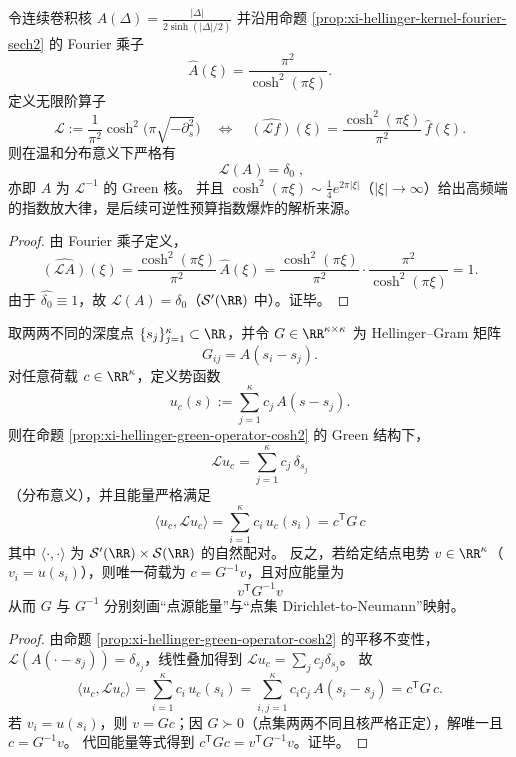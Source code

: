 %

\begin{proposition}\label{prop:xi-hellinger-green-operator-cosh2}
令连续卷积核
\(
A(\Delta)=\frac{|\Delta|}{2\sinh(|\Delta|/2)}
\)
并沿用命题 \ref{prop:xi-hellinger-kernel-fourier-sech2} 的 Fourier 乘子
\[
\widehat A(\xi)=\frac{\pi^2}{\cosh^2(\pi\xi)}.
\]
定义无限阶算子
\[
\mathcal L:=\frac{1}{\pi^2}\cosh^{2}\!\bigl(\pi\sqrt{-\partial_s^{2}}\bigr)
\quad\Longleftrightarrow\quad
\widehat{(\mathcal L f)}(\xi)=\frac{\cosh^{2}(\pi\xi)}{\pi^2}\,\widehat f(\xi).
\]
则在温和分布意义下严格有
\[
\boxed{\;\mathcal L(A)=\delta_0\;},
\]
亦即 \(A\) 为 \(\mathcal L^{-1}\) 的 Green 核。
并且 \(\cosh^{2}(\pi\xi)\sim \tfrac14 e^{2\pi|\xi|}\)（\(|\xi|\to\infty\)）给出高频端的指数放大律，是后续可逆性预算指数爆炸的解析来源。
\end{proposition}
\begin{proof}
由 Fourier 乘子定义，
\[
\widehat{(\mathcal L A)}(\xi)
=\frac{\cosh^{2}(\pi\xi)}{\pi^2}\,\widehat A(\xi)
=\frac{\cosh^{2}(\pi\xi)}{\pi^2}\cdot\frac{\pi^2}{\cosh^{2}(\pi\xi)}
=1.
\]
由于 \(\widehat{\delta_0}\equiv 1\)，故 \(\mathcal L(A)=\delta_0\)（\(\mathcal S'(\RR)\) 中）。证毕。
\end{proof}

\begin{proposition}\label{prop:xi-hellinger-charge-potential-duality-dtn}
取两两不同的深度点 \(\{s_j\}_{j=1}^\kappa\subset\RR\)，并令 \(G\in\RR^{\kappa\times\kappa}\) 为 Hellinger--Gram 矩阵
\[
G_{ij}=A(s_i-s_j).
\]
对任意荷载 \(c\in\RR^\kappa\)，定义势函数
\[
u_c(s):=\sum_{j=1}^{\kappa}c_j\,A(s-s_j).
\]
则在命题 \ref{prop:xi-hellinger-green-operator-cosh2} 的 Green 结构下，
\[
\mathcal L u_c=\sum_{j=1}^{\kappa}c_j\,\delta_{s_j}
\]
（分布意义），并且能量严格满足
\[
\boxed{\;
\langle u_c,\mathcal L u_c\rangle
=\sum_{i=1}^{\kappa}c_i\,u_c(s_i)
=c^{\mathsf T}G\,c\;}
\]
其中 \(\langle\cdot,\cdot\rangle\) 为 \(\mathcal S'(\RR)\times\mathcal S(\RR)\) 的自然配对。
反之，若给定结点电势 \(v\in\RR^\kappa\)（\(v_i=u(s_i)\)），则唯一荷载为 \(c=G^{-1}v\)，且对应能量为
\[
\boxed{\;v^{\mathsf T}G^{-1}v\;}
\]
从而 \(G\) 与 \(G^{-1}\) 分别刻画“点源能量”与“点集 Dirichlet-to-Neumann”映射。
\end{proposition}
\begin{proof}
由命题 \ref{prop:xi-hellinger-green-operator-cosh2} 的平移不变性，\(\mathcal L(A(\cdot-s_j))=\delta_{s_j}\)，线性叠加得到 \(\mathcal L u_c=\sum_j c_j\delta_{s_j}\)。
故
\[
\langle u_c,\mathcal L u_c\rangle
=\sum_{i=1}^{\kappa}c_i\,u_c(s_i)
=\sum_{i,j=1}^{\kappa}c_i c_j\,A(s_i-s_j)
=c^{\mathsf T}G\,c.
\]
若 \(v_i=u(s_i)\)，则 \(v=Gc\)；因 \(G\succ0\)（点集两两不同且核严格正定），解唯一且 \(c=G^{-1}v\)。
代回能量等式得到 \(c^{\mathsf T}G c=v^{\mathsf T}G^{-1}v\)。证毕。
\end{proof}
